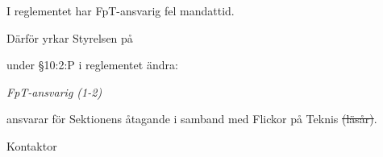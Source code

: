 \documentclass[../_main/handlingar.tex]{subfiles}
\begin{document}
I reglementet har FpT-ansvarig fel mandattid.

Därför yrkar Styrelsen på
\begin{attsatser}
    \att under \S10:2:P i reglementet ändra:\par
    {\it
    FpT-ansvarig (1-2)
    \begin{itemizedash}
        \item ansvarar för Sektionens åtagande i samband med Flickor på Teknis \sout{(läsår)}.
    \end{itemizedash}
    }
\end{attsatser}

\begin{signatures}{1}
    \ist
    \signature{Erik Månsson}{Kontaktor}
\end{signatures}
\end{document}
